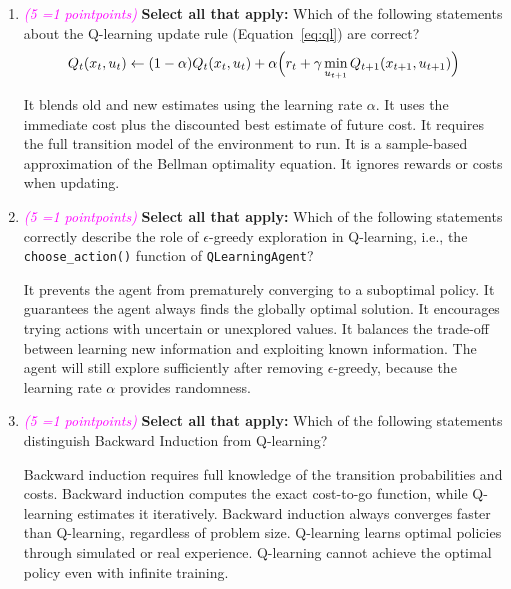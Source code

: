 \documentclass[11pt, letter, answers]{exam}
\newcommand{\grade}[1]{
    \small\textcolor{magenta}{\emph{(#1 \ifnum#1=1 point\else points\fi)}}%
    \normalsize
}
\newcommand{\sAll}{\textbf{Select all that apply: }}
\begin{document}
\begin{enumerate}[label=(\alph*)]

\item \grade{5} \sAll Which of the following statements about the Q-learning update rule (Equation~\ref{eq:ql}) are correct?
\begin{equation}
    Q_t(x_t, u_t) \leftarrow (1-\alpha) Q_t(x_t,u_t) + \alpha \Bigl( r_t + \gamma \min_{u_{t+1}} Q_{t+1}(x_{t+1}, u_{t+1}) \Bigr)
    \label{eq:ql}
\end{equation}
{
\checkboxchar{$\Box$} \checkedchar{$\blacksquare$}  %
\begin{checkboxes}
    \CorrectChoice It blends old and new estimates using the learning rate $\alpha$.
    \CorrectChoice It uses the immediate cost plus the discounted best estimate of future cost.
    \choice It requires the full transition model of the environment to run.
    \CorrectChoice It is a sample-based approximation of the Bellman optimality equation.
    \choice It ignores rewards or costs when updating.
\end{checkboxes}
}


\item \grade{5} \sAll Which of the following statements correctly describe the role of $\epsilon$-greedy exploration in Q-learning, i.e., the \texttt{choose\_action()} function of \texttt{QLearningAgent}?
{
\checkboxchar{$\Box$} \checkedchar{$\blacksquare$}  %
\begin{checkboxes}
    \CorrectChoice It prevents the agent from prematurely converging to a suboptimal policy.
    \choice It guarantees the agent always finds the globally optimal solution.
    \CorrectChoice It encourages trying actions with uncertain or unexplored values.
    \CorrectChoice It balances the trade-off between learning new information and exploiting known information.
    \choice The agent will still explore sufficiently after removing $\epsilon$-greedy, because the learning rate $\alpha$ provides randomness.
\end{checkboxes}
}


\item \grade{5} \sAll Which of the following statements distinguish Backward Induction from Q-learning?
{
\checkboxchar{$\Box$} \checkedchar{$\blacksquare$}  %
\begin{checkboxes}
    \CorrectChoice Backward induction requires full knowledge of the transition probabilities and costs.
    \CorrectChoice Backward induction computes the exact cost-to-go function, while Q-learning estimates it iteratively.
    \choice Backward induction always converges faster than Q-learning, regardless of problem size.
    \CorrectChoice Q-learning learns optimal policies through simulated or real experience.
    \choice Q-learning cannot achieve the optimal policy even with infinite training.
\end{checkboxes}
}



\end{enumerate}
\end{document}
